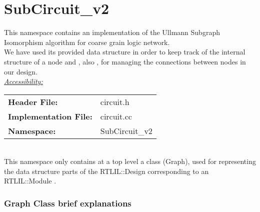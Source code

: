 \documentclass{article}
\newcommand{\sectionbreak}{\clearpage}
\begin{document}
\sectionbreak{\clearpage}



\section{SubCircuit\_v2}

This namespace contains an implementation of the Ullmann Subgraph Isomorphism algorithm for coarse grain logic network.\\

We have used its provided data structure in order to keep track of the internal structure of a node and , also , for managing the connections between nodes in our design.\\

\underline{\textit{\underline{Accessibility: }}}\\

\begin{tabular}{ll}
	\textbf{Header File:} & circuit.h\\
	\textbf{Implementation File:} & circuit.cc\\
	\textbf{Namespace: } & SubCircuit\_v2\\
\end{tabular}\\

This namespace only contains at a top level a class (Graph), used for representing the data structure parts of the RTLIL::Design corresponding to an RTLIL::Module .\\

\subsubsection{Graph Class brief explanations}
\end{document}
